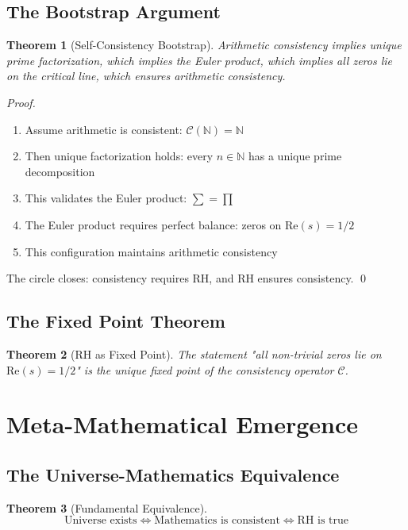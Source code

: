 \documentclass[12pt]{article}
\newtheorem{theorem}{Theorem}[section]
\newcommand{\N}{\mathbb{N}}
\begin{document}
\subsection{The Bootstrap Argument}

\begin{theorem}[Self-Consistency Bootstrap]
Arithmetic consistency implies unique prime factorization, which implies the Euler product, which implies all zeros lie on the critical line, which ensures arithmetic consistency.
\end{theorem}

\begin{proof}
\begin{enumerate}
\item Assume arithmetic is consistent: $\mathcal{C}(\N) = \N$
\item Then unique factorization holds: every $n \in \N$ has a unique prime decomposition
\item This validates the Euler product: $\sum = \prod$
\item The Euler product requires perfect balance: zeros on $\text{Re}(s) = 1/2$
\item This configuration maintains arithmetic consistency
\end{enumerate}
The circle closes: consistency requires RH, and RH ensures consistency. \qed
\end{proof}

\subsection{The Fixed Point Theorem}

\begin{theorem}[RH as Fixed Point]
The statement "all non-trivial zeros lie on $\text{Re}(s) = 1/2$" is the unique fixed point of the consistency operator $\mathcal{C}$.
\end{theorem}

\section{Meta-Mathematical Emergence}

\subsection{The Universe-Mathematics Equivalence}

\begin{theorem}[Fundamental Equivalence]
$$\text{Universe exists} \Leftrightarrow \text{Mathematics is consistent} \Leftrightarrow \text{RH is true}$$
\end{theorem}
\end{document}
